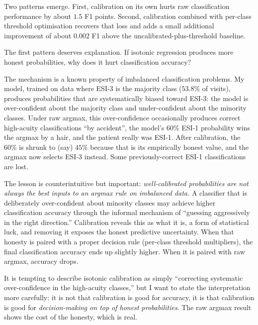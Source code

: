Two patterns emerge. First, calibration on its own hurts raw classification performance by about $1.5$ F1 points. Second, calibration combined with per-class threshold optimisation recovers that loss and adds a small additional improvement of about $0.002$ F1 above the uncalibrated-plus-threshold baseline.

The first pattern deserves explanation. If isotonic regression produces more honest probabilities, why does it hurt classification accuracy?

The mechanism is a known property of imbalanced classification problems. My model, trained on data where ESI-3 is the majority class ($53.8\%$ of visits), produces probabilities that are systematically biased toward ESI-3: the model is over-confident about the majority class and under-confident about the minority classes. Under raw argmax, this over-confidence occasionally produces correct high-acuity classifications ``by accident'', the model's $60\%$ ESI-1 probability wins the argmax by a hair, and the patient really was ESI-1. After calibration, the $60\%$ is shrunk to (say) $45\%$ because that is its empirically honest value, and the argmax now selects ESI-3 instead. Some previously-correct ESI-1 classifications are lost.

The lesson is counterintuitive but important: \emph{well-calibrated probabilities are not always the best inputs to an argmax rule on imbalanced data.} A classifier that is deliberately over-confident about minority classes may achieve higher classification accuracy through the informal mechanism of ``guessing aggressively in the right direction.'' Calibration reveals this as what it is, a form of statistical luck, and removing it exposes the honest predictive uncertainty. When that honesty is paired with a proper decision rule (per-class threshold multipliers), the final classification accuracy ends up slightly higher. When it is paired with raw argmax, accuracy drops.

It is tempting to describe isotonic calibration as simply ``correcting systematic over-confidence in the high-acuity classes,'' but I want to state the interpretation more carefully: it is not that calibration is good for accuracy, it is that calibration is good for \emph{decision-making on top of honest probabilities}. The raw argmax result shows the cost of the honesty, which is real.


